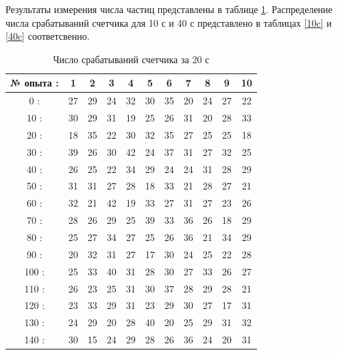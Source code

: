 \documentclass[a4paper,12pt]{article} %
\begin{document}
Результаты измерения числа частиц представлены в таблице \ref{20c}. Распределение числа срабатываний счетчика для 10 с и 40 с представлено в таблицах \ref{10c} и \ref{40c} соответсвенно.


\begin{table}
\caption{Число срабатываний счетчика за 20 с} \label{20c}
\begin{tabular}{|c|c|c|c|c|c|c|c|c|c|c|}
\hline 
№ опыта : & 1 & 2 & 3 & 4 & 5 & 6 & 7 & 8 & 9 & 10 \\ 
\hline 
0 : & 27 & 29 & 24 & 32 & 30 & 35 & 20 & 24 & 27 & 22 \\ 

10 : & 30 & 29 & 31 & 19 & 25 & 26 & 31 & 20 & 28 & 33 \\ 
 
20 : & 18 & 35 & 22 & 30 & 32 & 35 & 27 & 25 & 25 & 18 \\ 

30 : & 39 & 26 & 30 & 42 & 24 & 37 & 31 & 27 & 32 & 25 \\ 

40 : & 26 & 25 & 22 & 34 & 29 & 24 & 24 & 31 & 28 & 29 \\ 

50 : & 31 & 31 & 27 & 28 & 18 & 33 & 21 & 28 & 27 & 21 \\ 
 
60 : & 32 & 21 & 42 & 19 & 33 & 27 & 31 & 27 & 23 & 26 \\ 
 
70 : & 28 & 26 & 29 & 25 & 39 & 33 & 36 & 26 & 18 & 29 \\ 

80 : & 25 & 27 & 34 & 27 & 25 & 26 & 36 & 21 & 34 & 29 \\ 

90 : & 20 & 32 & 31 & 27 & 17 & 30 & 24 & 25 & 22 & 28 \\ 

100 : & 25 & 33 & 40 & 31 & 28 & 30 & 27 & 33 & 26 & 27 \\ 

110 : & 26 & 23 & 25 & 31 & 30 & 37 & 28 & 29 & 28 & 21 \\ 

120 : & 23 & 33 & 29 & 31 & 23 & 29 & 30 & 27 & 17 & 31 \\ 

130 : & 24 & 29 & 20 & 28 & 40 & 20 & 25 & 29 & 31 & 32 \\ 

140 : & 30 & 15 & 24 & 29 & 28 & 26 & 36 & 24 & 20 & 31 \\ 


\end{tabular}
\end{table}
\end{document}
